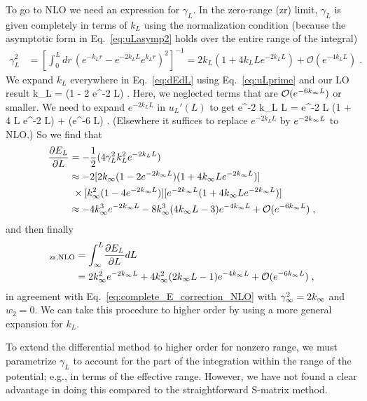 	To go to NLO we need an expression for $\gamma_L$.  In the zero-range
	(zr) limit, $\gamma_L$ is given completely in terms of $k_L$ using the
	normalization condition (because the asymptotic form in
	Eq.~\eqref{eq:uLasymp2} holds
	over the entire range of the integral)
	\begin{align}
	  \gamma_L^2 &= \left[\int_0^L\! dr\, (e^{-k_L r} - e^{-2k_L L}e^{k_L r})^2
		\right]^{-1}
	  =
	  2 k_L(1 + 4 k_L L e^{-2 k_L L}) + \mathcal{O}(e^{-4 k_L L}) \;.
	\end{align}
	We expand $k_L$ everywhere in Eq.~\eqref{eq:dEdL} using
	Eq.~\eqref{eq:uLprime} and our LO result
	\beq
	   k_L = \kinf (1 - 2 e^{-2 \kinf L}) \;.
	\eeq
	Here, we neglected terms that are $\mathcal{O}(e^{-6 k_{\infty} L})$ or smaller.
	We need to expand $e^{-2 k_L L}$ in $u_L'(L)$ to get
	\beq
	   e^{-2 k_L L} = e^{-2 \kinf L} (1 + 4 \kinf L e^{-2 \kinf L})
	    + (e^{-6 \kinf L}) \;.
	\eeq
	(Elsewhere it suffices to replace $e^{-2 k_L L}$ by $e^{-2 k_{\infty} L}$ to NLO.)
	So we find that
	\begin{align}
	  \frac{\partial E_L}{\partial L} &= -\frac12 (4 \gamma_L^2 k_L^2
		e^{-2 k_L L})
	  \nonumber \\
	  &\approx -2  [2\kinf (1 - 2 e^{-2 \kinf L})(1 + 4 \kinf L
		e^{-2 \kinf L})]
	  \nonumber \\
	  & \  \null \times [\kinf^2 (1 - 4 e^{-2\kinf L})][e^{-2 \kinf L}
		(1 + 4 \kinf L e^{-2 \kinf L})]
	  \nonumber \\
	  &\approx
	  -4 \kinf^3 e^{-2 \kinf L} -  8 \kinf^3 (4\kinf L - 3)e^{-4 \kinf L}
	  + \mathcal{O}(e^{-6 \kinf L}) \;,
	\end{align}
	and then finally
	\begin{align}
	[\Delta E_L]_{\rm zr, NLO}
	     &= \int_\infty^L\! \frac{\partial E_L}{\partial L} dL
	     \nonumber \\
	     &=
	     2 \kinf^2 e^{-2 \kinf L} +  4 \kinf^2 (2\kinf L - 1)e^{-4 \kinf L}
	     + \mathcal{O}(e^{-6 \kinf L})
	     \;,
	\end{align}
	in agreement with Eq.~\eqref{eq:complete_E_correction_NLO}
	with $\gamma_\infty^2 = 2k_{\infty}$ and $w_2 = 0$.
	We can take this procedure to higher order by
	using a more general expansion for $k_L$.

	To extend the differential method
	to higher order for nonzero range, we must parametrize
	$\gamma_L$ to account for the part of the integration within the
	range of the potential; e.g., in terms of the effective range.  However,
	we have not found a clear advantage in doing this
	compared to the straightforward S-matrix method.

